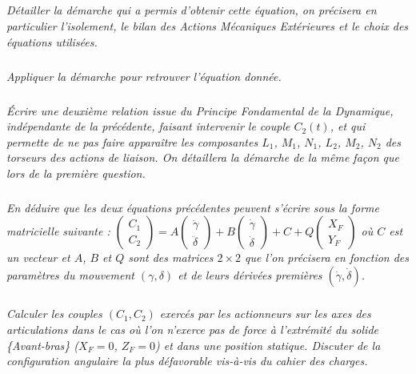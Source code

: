 \begin{multicols}{2}
\subparagraph{}
\textit{Détailler la démarche qui a permis d’obtenir cette équation, on précisera en particulier l’isolement,
le bilan des Actions Mécaniques Extérieures et le choix des équations utilisées.}
\ifprof
\begin{corrige}
\end{corrige}
\else
\fi

\subparagraph{}
\textit{Appliquer la démarche pour retrouver l'équation donnée.}
\ifprof
\begin{corrige}
\end{corrige}
\else
\fi

\subparagraph{}
\textit{Écrire une deuxième relation issue du Principe Fondamental de la Dynamique, indépendante de la
précédente, faisant intervenir le couple $C_2(t)$, et qui permette de ne pas faire apparaître les composantes $L_1$, $M_1$, $N_1$, $L_2$, $M_2$, $N_2$ des torseurs des actions de liaison. On détaillera la démarche de la même façon que lors de la première question.}

\ifprof
\begin{corrige}
\end{corrige}
\else
\fi

\subparagraph{}\textit{En déduire que les deux équations précédentes peuvent s'écrire sous la forme matricielle suivante : 
$\begin{pmatrix}
C_1 \\ C_2
\end{pmatrix}
=
A
\begin{pmatrix}
\ddot{\gamma} \\ \ddot{\delta}
\end{pmatrix}
+
B
\begin{pmatrix}
\dot{\gamma} \\ \dot{\delta}
\end{pmatrix}
+
C
+
Q
\begin{pmatrix}
X_F \\ Y_F
\end{pmatrix}$ où $C$ est un vecteur et $A$, $B$ et $Q$ sont des matrices $2\times 2$ que l'on précisera en fonction des paramètres du mouvement $\left(\gamma,\delta\right)$ et de leurs dérivées premières $\left(\dot{\gamma},\dot{\delta}\right)$.
}

\ifprof
\begin{corrige}
\end{corrige}
\else
\fi


\subparagraph{}
\textit{Calculer les couples $(C_1,C_2)$ exercés par les actionneurs sur les axes des articulations dans le cas où
l’on n’exerce pas de force à l’extrémité du solide \{Avant-bras\} ($X_F = 0$, $Z_F = 0$) et dans une position statique. Discuter de la configuration angulaire la plus défavorable vis-à-vis du cahier des charges.}
\ifprof
\begin{corrige}
\end{corrige}
\else
\fi



\end{multicols}
